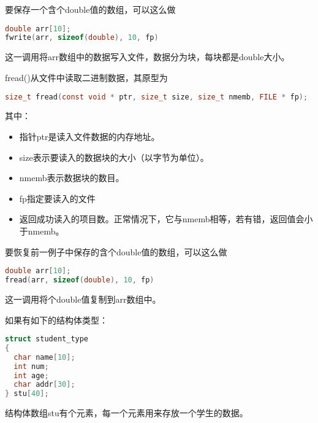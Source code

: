\begin{frame}[fragile]
  要保存一个含{}个{\tf double}值的数组，可以这么做
  \begin{lstlisting}[language=c,backgroundcolor=\color{red!20}]
double arr[10];
fwrite(arr, sizeof(double), 10, fp)
  \end{lstlisting}
  这一调用将{\tf arr}数组中的数据写入文件，数据分为{}块，每块都是{\tf double}大小。
\end{frame}


\begin{frame}[fragile]
  {\tf fread()}从文件中读取二进制数据，其原型为
  \begin{lstlisting}[language=c,backgroundcolor=\color{red!20}]
size_t fread(const void * ptr, size_t size, size_t nmemb, FILE * fp);
  \end{lstlisting}
  其中：
  \begin{itemize}
  \item 指针{\tf ptr}是读入文件数据的内存地址。
  \item {\tf size}表示要读入的数据块的大小（以字节为单位）。
  \item {\tf nmemb}表示数据块的数目。
  \item {\tf fp}指定要读入的文件
  \item 返回成功读入的项目数。正常情况下，它与{\tf nmemb}相等，若有错，返回值会小于{\tf nmemb}。
  \end{itemize}
\end{frame}

\begin{frame}[fragile]
  要恢复前一例子中保存的含{}个{\tf double}值的数组，可以这么做
  \begin{lstlisting}[language=c,backgroundcolor=\color{red!20}]
double arr[10];
fread(arr, sizeof(double), 10, fp)
  \end{lstlisting}
  这一调用将{}个{\tf double}值复制到{\tf arr}数组中。
\end{frame}


\begin{frame}[fragile]
  如果有如下的结构体类型：
  \begin{lstlisting}[language=c,backgroundcolor=\color{red!20}]
struct student_type
{
  char name[10]; 
  int num; 
  int age; 
  char addr[30];
} stu[40];
  \end{lstlisting}
  结构体数组{\tf stu}有{}个元素，每一个元素用来存放一个学生的数据。
\end{frame}

